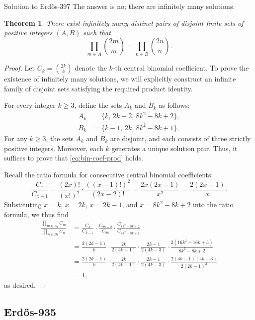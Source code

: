 \documentclass{article}
\theoremstyle{plain}
\newtheorem{theorem}{Theorem}
\theoremstyle{definition}
\begin{document}
\begin{solution}{Solution to Erdős-397}
The answer is no; there are infinitely many solutions.

\begin{theorem}
There exist infinitely many distinct pairs of disjoint finite sets of positive integers $(A, B)$ such that
\begin{equation}\label{eq:bin-coef-prod}
\prod_{m \in A} \binom{2m}{m} = \prod_{n \in B} \binom{2n}{n}.
\end{equation}
\end{theorem}
\begin{proof}
Let $C_k = \binom{2k}{k}$ denote the $k$-th central binomial coefficient. To prove the existence of infinitely many solutions, we will explicitly construct an infinite family of disjoint sets satisfying the required product identity.

For every integer $k \ge 3$, define the sets $A_k$ and $B_k$ as follows:
\begin{align*}
    A_k &= \{k, \, 2k-2, \, 8k^2-8k+2\}, \\
    B_k &= \{k-1, \, 2k, \, 8k^2-8k+1\}.
\end{align*}
For any $k\geq 3$, the sets $A_k$ and $B_k$ are disjoint, and each consists of three strictly positive integers. Moreover, each $k$ generates a unique solution pair. Thus, it suffices to prove that \eqref{eq:bin-coef-prod} holds.

Recall the ratio formula for consecutive central binomial coefficients:
\[ \frac{C_x}{C_{x-1}} = \frac{(2x)!}{(x!)^2} \cdot \frac{((x-1)!)^2}{(2x-2)!} = \frac{2x(2x-1)}{x^2} = \frac{2(2x-1)}{x}. \]
Substituting $x=k$, $x=2k$, $x=2k-1$, and $x=8k^2-8k+2$ into the ratio formula, we thus find
\begin{align*}
\frac{\prod_{m\in A_k}C_m}{\prod_{n\in B_k}C_n}
&=\frac{C_k}{C_{k-1}}\cdot\frac{C_{2k-2}}{C_{2k}}\cdot\frac{C_{8k^2-8k+2}}{C_{8k^2-8k+1}}\\
&=\frac{2(2k-1)}k\cdot\frac{2k}{2(4k-1)}\cdot\frac{2k-1}{2(4k-3)}\cdot\frac{2(16k^2-16k+3)}{8k^2-8k+2}\\
&=\frac{2(2k-1)}k\cdot\frac{2k}{2(4k-1)}\cdot\frac{2k-1}{2(4k-3)}\cdot\frac{2(4k-1)(4k-3)}{2(2k-1)^2}\\
&=1,
\end{align*}
as desired.
\end{proof}


\end{solution}

\subsection{Erdős-935}
\end{document}
